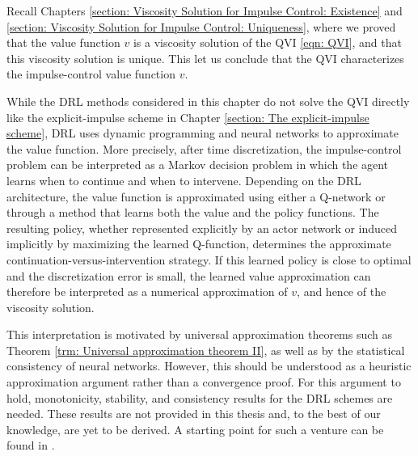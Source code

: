 \begin{remark}
    Recall Chapters \ref{section: Viscosity Solution for Impulse Control: Existence} and \ref{section: Viscosity Solution for Impulse Control: Uniqueness}, where we proved that the value function $v$ is a viscosity solution of the QVI \eqref{eqn: QVI}, and that this viscosity solution is unique. This let us conclude that the QVI characterizes the impulse-control value function $v$. 

    While the DRL methods considered in this chapter do not solve the QVI directly like the explicit-impulse scheme in Chapter \ref{section: The explicit-impulse scheme}, DRL uses dynamic programming and neural networks to approximate the value function. More precisely, after time discretization, the impulse-control problem can be interpreted as a Markov decision problem in which the agent learns when to continue and when to intervene. Depending on the DRL architecture, the value function is approximated using either a Q-network or through a method that learns both the value and the policy functions. The resulting policy, whether represented explicitly by an actor network or induced implicitly by maximizing the learned Q-function, determines the approximate continuation-versus-intervention strategy. If this learned policy is close to optimal and the discretization error is small, the learned value approximation can therefore be interpreted as a numerical approximation of $v$, and hence of the viscosity solution.

    This interpretation is motivated by universal approximation theorems such as Theorem \ref{trm: Universal approximation theorem II}, as well as by the statistical consistency of neural networks. However, this should be understood as a heuristic approximation argument rather than a convergence proof. For this argument to hold, monotonicity, stability, and consistency results for the DRL schemes are needed. These results are not provided in this thesis and, to the best of our knowledge, are yet to be derived. A starting point for such a venture can be found in \cite{bayraktar2023approximate}. 
\end{remark}


